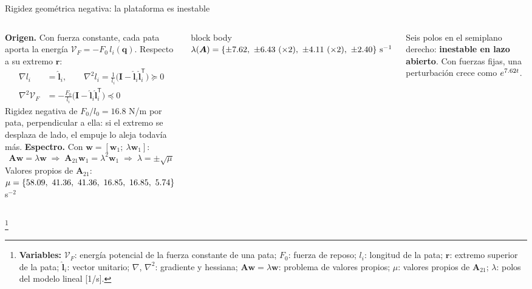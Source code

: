 \documentclass[aspectratio=169,10pt]{beamer}
\newcommand{\vect}[1]{\bm{#1}}
\newcommand{\T}{^{\mathsf{T}}}
\newcommand{\variables}[1]{\begingroup\renewcommand{\thefootnote}{}\footnote[frame]{\textbf{Variables:} #1}\addtocounter{footnote}{-1}\endgroup}
\newcommand{\resultado}[1]{\par\smallskip\begin{beamercolorbox}[rounded=true,sep=0.45em,center]{block body}#1\end{beamercolorbox}\par\smallskip}
\begin{document}
\begin{frame}{Rigidez geométrica negativa: la plataforma es inestable}
\small
\begin{columns}[T]
\textbf{Origen.} Con fuerza constante, cada pata aporta la energía $\mathcal V_F = -F_0\,l_i(\vect q)$. Respecto a su extremo $\vect r$:
\begin{align*}
\nabla l_i &= \hat{\vect l}_i,\qquad \nabla^2l_i = \tfrac{1}{l_i}\big(\vect I - \hat{\vect l}_i\hat{\vect l}_i\T\big)\succeq 0\\
\nabla^2\mathcal V_F &= -\tfrac{F_0}{l_i}\big(\vect I - \hat{\vect l}_i\hat{\vect l}_i\T\big)\preceq 0
\end{align*}
Rigidez negativa de $F_0/l_0 = 16.8$ N/m por pata, perpendicular a ella: si el extremo se desplaza de lado, el empuje lo aleja todavía más.
\textbf{Espectro.} Con $\vect w = [\vect w_1;\ \lambda\vect w_1]$:
\[
\vect A\vect w = \lambda\vect w \;\Rightarrow\; \vect A_{21}\vect w_1 = \lambda^2\vect w_1 \;\Rightarrow\; \lambda = \pm\sqrt\mu
\]
Valores propios de $\vect A_{21}$: $\mu = \{58.09,\allowbreak\ 41.36,\allowbreak\ 41.36,\allowbreak\ 16.85,\allowbreak\ 16.85,\allowbreak\ 5.74\}$ s$^{-2}$
\resultado{$\lambda(\vect A) = \{\PolosLA\}\ \text{s}^{-1}$}
Seis polos en el semiplano derecho: \textbf{inestable en lazo abierto}. Con fuerzas fijas, una perturbación crece como $e^{7.62 t}$.
\end{columns}
\variables{$\mathcal V_F$: energía potencial de la fuerza constante de una pata; $F_0$: fuerza de reposo; $l_i$: longitud de la pata; $\vect r$: extremo superior de la pata; $\hat{\vect l}_i$: vector unitario; $\nabla$, $\nabla^2$: gradiente y hessiana; $\vect A\vect w = \lambda\vect w$: problema de valores propios; $\mu$: valores propios de $\vect A_{21}$; $\lambda$: polos del modelo lineal [1/s].}
\end{frame}
\end{document}
